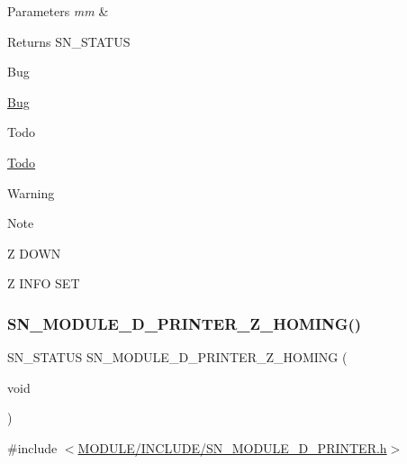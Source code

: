 \begin{DoxyParams}{Parameters}
{\em mm} & \\
\hline
\end{DoxyParams}
\begin{DoxyReturn}{Returns}
S\+N\+\_\+\+S\+T\+A\+T\+US 
\end{DoxyReturn}
\begin{DoxyRefDesc}{Bug}
\item[\hyperlink{bug__bug000011}{Bug}]\end{DoxyRefDesc}
\begin{DoxyRefDesc}{Todo}
\item[\hyperlink{todo__todo000011}{Todo}]\end{DoxyRefDesc}
\begin{DoxyWarning}{Warning}

\end{DoxyWarning}
\begin{DoxyNote}{Note}

\end{DoxyNote}
Z D\+O\+WN

Z I\+N\+FO S\+ET \mbox{\label{group__PRINTER_gafa7b9a2a41989695e1b881b984794432}} 
\subsubsection{\texorpdfstring{S\+N\+\_\+\+M\+O\+D\+U\+L\+E\+\_\+D\+\_\+\+P\+R\+I\+N\+T\+E\+R\+\_\+\+Z\+\_\+\+H\+O\+M\+I\+N\+G()}{SN\_MODULE\_3D\_PRINTER\_Z\_HOMING()}}
{\footnotesize\ttfamily S\+N\+\_\+\+S\+T\+A\+T\+US S\+N\+\_\+\+M\+O\+D\+U\+L\+E\+\_\+D\+\_\+\+P\+R\+I\+N\+T\+E\+R\+\_\+\+Z\+\_\+\+H\+O\+M\+I\+NG (\begin{DoxyParamCaption}\item[{void}]{ }\end{DoxyParamCaption})}



{\ttfamily \#include $<$\hyperlink{SN__MODULE__3D__PRINTER_8h}{M\+O\+D\+U\+L\+E/\+I\+N\+C\+L\+U\+D\+E/\+S\+N\+\_\+\+M\+O\+D\+U\+L\+E\+\_\+D\+\_\+\+P\+R\+I\+N\+T\+E\+R.\+h}$>$}


